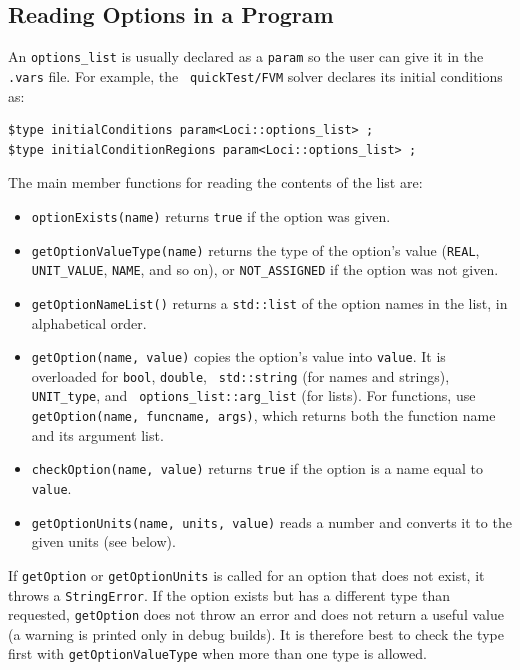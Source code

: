 \subsection {Reading Options in a Program}
%
An {\tt options\_list} is usually declared as a {\tt param} so the user
can give it in the {\tt .vars} file.  For example, the {\tt
  quickTest/FVM} solver declares its initial conditions as:
\begin{verbatim}
$type initialConditions param<Loci::options_list> ;
$type initialConditionRegions param<Loci::options_list> ;
\end{verbatim}
The main member functions for reading the contents of the list are:
\begin{itemize}
\item {\tt optionExists(name)} returns {\tt true} if the option was
  given.
\item {\tt getOptionValueType(name)} returns the type of the option's
  value ({\tt REAL}, {\tt UNIT\_VALUE}, {\tt NAME}, and so on), or
  {\tt NOT\_ASSIGNED} if the option was not given.
\item {\tt getOptionNameList()} returns a {\tt std::list} of the option
  names in the list, in alphabetical order.
\item {\tt getOption(name, value)} copies the option's value into
  {\tt value}.  It is overloaded for {\tt bool}, {\tt double}, {\tt
    std::string} (for names and strings), {\tt UNIT\_type}, and {\tt
    options\_list::arg\_list} (for lists).  For functions, use {\tt
    getOption(name, funcname, args)}, which returns both the function
  name and its argument list.
\item {\tt checkOption(name, value)} returns {\tt true} if the option
  is a name equal to {\tt value}.
\item {\tt getOptionUnits(name, units, value)} reads a number and
  converts it to the given units (see below).
\end{itemize}
%
If {\tt getOption} or {\tt getOptionUnits} is called for an option that
does not exist, it throws a {\tt StringError}.  If the option exists
but has a different type than requested, {\tt getOption} does not
throw an error and does not return a useful value (a warning is printed
only in debug builds).  It is therefore best to check the type first
with {\tt getOptionValueType} when more than one type is allowed.
%
